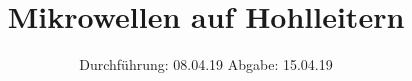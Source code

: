 

\subject{V53}
\title{Mikrowellen auf Hohlleitern}
\date{
  Durchführung: 08.04.19
  \hspace{3em}
  Abgabe: 15.04.19
}



\maketitle
\thispagestyle{empty}
\tableofcontents
\newpage




%



\newpage
\printbibliography


